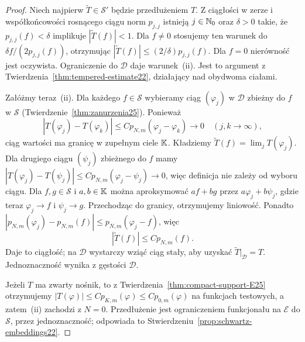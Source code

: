\begin{proof}
Niech najpierw $\widetilde T\in\mathcal S'$ będzie
przedłużeniem $T$. Z ciągłości w zerze i współkońcowości
rosnącego ciągu norm $p_{j,j}$ istnieją $j\in\mathbb N_0$ oraz
$\delta>0$ takie, że $p_{j,j}(f)<\delta$ implikuje
$|\widetilde T(f)|<1$. Dla $f\ne0$ stosujemy ten warunek
do $\delta f/(2p_{j,j}(f))$, otrzymując
$|\widetilde T(f)|\le (2/\delta)p_{j,j}(f)$.
Dla $f=0$ nierówność jest oczywista. Ograniczenie
do $\mathcal D$ daje warunek~\textup{(ii)}.
Jest to argument z Twierdzenia~\ref{thm:tempered-estimate22},
działający nad obydwoma ciałami.

Załóżmy teraz~\textup{(ii)}. Dla każdego $f\in\mathcal S$
wybieramy ciąg $(\varphi_j)$ w $\mathcal D$ zbieżny do $f$
w $\mathcal S$ (Twierdzenie~\ref{thm:zanurzenia25}).
Ponieważ
\[
 |T(\varphi_j)-T(\varphi_k)|
 \le C p_{N,m}(\varphi_j-\varphi_k)\longrightarrow0
 \quad(j,k\to\infty),
\]
ciąg wartości ma granicę w zupełnym ciele $\mathbb K$.
Kładziemy $\widetilde T(f)=\lim_jT(\varphi_j)$.
Dla drugiego ciągu $(\psi_j)$ zbieżnego do $f$ mamy
$|T(\varphi_j)-T(\psi_j)|\le
C p_{N,m}(\varphi_j-\psi_j)\to0$, więc definicja nie zależy
od wyboru ciągu. Dla $f,g\in\mathcal S$ i $a,b\in\mathbb K$
można aproksymować $af+bg$ przez $a\varphi_j+b\psi_j$,
gdzie teraz $\varphi_j\to f$ i $\psi_j\to g$.
Przechodząc do granicy, otrzymujemy liniowość.
Ponadto $|p_{N,m}(\varphi_j)-p_{N,m}(f)|
\le p_{N,m}(\varphi_j-f)$, więc
\[
 |\widetilde T(f)|\le C p_{N,m}(f).
\]
Daje to ciągłość; na $\mathcal D$ wystarczy wziąć
ciąg stały, aby uzyskać $\widetilde T|_{\mathcal D}=T$.
Jednoznaczność wynika z gęstości $\mathcal D$.

Jeżeli $T$ ma zwarty nośnik, to z
Twierdzenia~\ref{thm:compact-support-E25} otrzymujemy
$|T(\varphi)|\le C p_{K,m}(\varphi)\le C p_{0,m}(\varphi)$
na funkcjach testowych, a zatem~\textup{(ii)} zachodzi z $N=0$.
Przedłużenie jest ograniczeniem funkcjonału na $\mathcal E$
do $\mathcal S$, przez jednoznaczność; odpowiada to
Stwierdzeniu~\ref{prop:schwartz-embeddings22}.
\end{proof}

